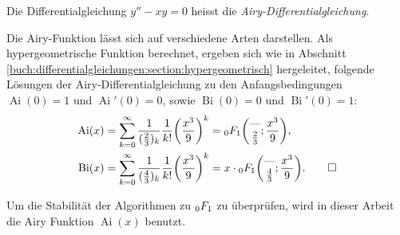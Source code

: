 \begin{definition}
    \label{0f1:airy:differentialgleichung:def}
    Die Differentialgleichung
    $y'' - xy = 0$
    heisst die {\em Airy-Differentialgleichung}.
%
\end{definition}

Die Airy-Funktion lässt sich auf verschiedene Arten darstellen. 
Als hypergeometrische Funktion berechnet, ergeben sich wie in
Abschnitt \ref{buch:differentialgleichungen:section:hypergeometrisch}
hergeleitet, folgende Lösungen der Airy-Differential\-gleichung zu
den Anfangsbedingungen $\operatorname{Ai}(0)=1$ und
$\operatorname{Ai}'(0)=0$, sowie $\operatorname{Bi}(0)=0$ und
$\operatorname{Bi}'(0)=1$:
%
%
\begin{align}
\label{0f1:airy:hypergeometrisch:eq}
\operatorname{Ai}(x)
&=
\sum_{k=0}^\infty
\frac{1}{(\frac23)_k} \frac{1}{k!}\biggl(\frac{x^3}{9}\biggr)^k
=
\mathstrut_0F_1\biggl(
\begin{matrix}\text{---}\\\frac23\end{matrix};\frac{x^3}{9}
\biggr),
\\
\operatorname{Bi}(x)
&=
\sum_{k=0}^\infty
\frac{1}{(\frac43)_k} \frac{1}{k!}\biggl(\frac{x^3}{9}\biggr)^k
=
x\cdot\mathstrut_0F_1\biggl(
\begin{matrix}\text{---}\\\frac43\end{matrix};
\frac{x^3}{9}
\biggr).
\qedhere
\end{align}

Um die Stabilität der Algorithmen zu $\mathstrut_0F_1$ zu überprüfen, wird in dieser Arbeit die Airy Funktion $\operatorname{Ai}(x)$ benutzt.


